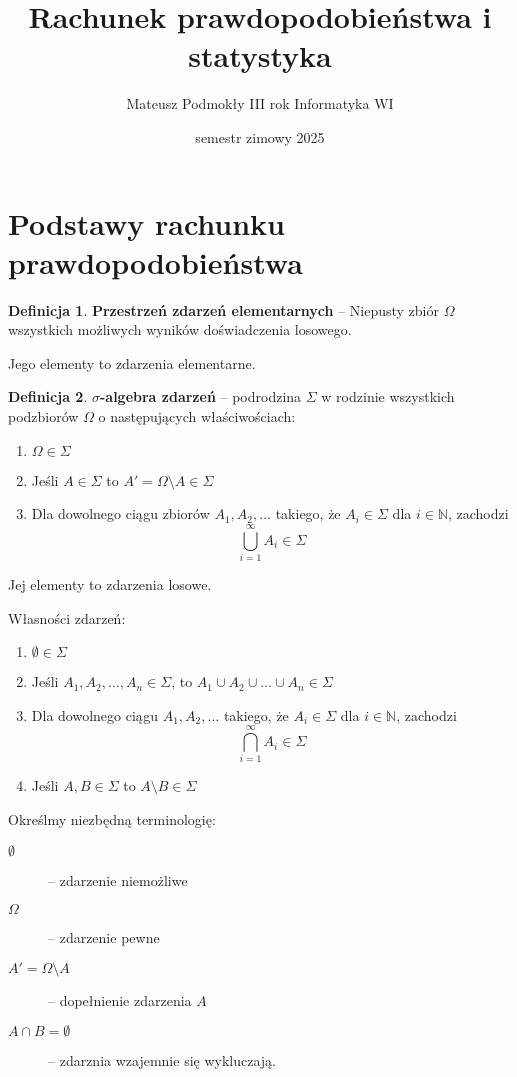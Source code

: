 \documentclass[11pt, leqno]{scrartcl}
\title{Rachunek prawdopodobieństwa i statystyka}
\author{Mateusz Podmokły III rok Informatyka WI}
\date{semestr zimowy 2025}
\theoremstyle{definition}
\newtheorem{definition}{Definicja}[section]
\begin{document}
    \maketitle
    \section{Podstawy rachunku prawdopodobieństwa}

    \begin{definition}
        \textbf{Przestrzeń zdarzeń elementarnych} -- Niepusty zbiór
        $\Omega$ wszystkich możliwych wyników doświadczenia losowego.
    \end{definition}
    \noindent
    Jego elementy to zdarzenia elementarne.
    \begin{definition}
        \textbf{$\sigma$-algebra zdarzeń} -- podrodzina $\Sigma$
        w rodzinie wszystkich podzbiorów $\Omega$ o następujących
        właściwościach:
        \begin{enumerate}
            \item $\Omega \in \Sigma$
            \item Jeśli $A \in \Sigma$ to $A'=\Omega \setminus A \in
                \Sigma$
            \item Dla dowolnego ciągu zbiorów $A_1,A_2,\dots$ takiego,
                że $A_i \in \Sigma$ dla $i \in \mathbb{N}$, zachodzi
                \[
                    \bigcup_{i=1}^{\infty}A_i \in \Sigma
                \]
        \end{enumerate}
        Jej elementy to zdarzenia losowe.
    \end{definition}
    \noindent
    Własności zdarzeń:
    \begin{enumerate}
        \item $\emptyset \in \Sigma$
        \item Jeśli $A_1,A_2,\dots,A_n \in \Sigma$, to
            $A_1 \cup A_2 \cup \dots \cup A_n \in \Sigma$
        \item Dla dowolnego ciągu $A_1,A_2,\dots$ takiego, że
            $A_i \in \Sigma$ dla $i \in \mathbb{N}$, zachodzi
            \[
                \bigcap_{i=1}^{\infty}A_i \in \Sigma
            \]
        \item Jeśli $A,B \in \Sigma$ to $A \setminus B \in \Sigma$
    \end{enumerate}
    Określmy niezbędną terminologię:
    \begin{description}
        \item[$\emptyset$] -- zdarzenie niemożliwe
        \item[$\Omega$] -- zdarzenie pewne
        \item[$A'=\Omega \setminus A$] -- dopełnienie zdarzenia $A$
        \item[$A \cap B= \emptyset$] -- zdarznia wzajemnie się
            wykluczają.
    \end{description}
\end{document}
